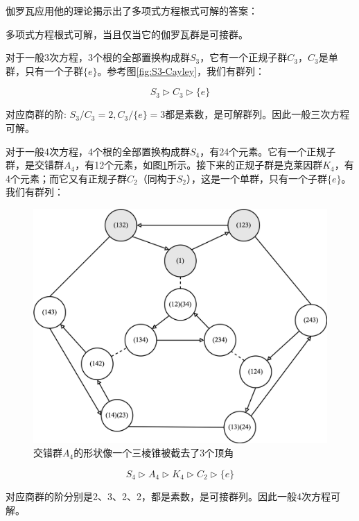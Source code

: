 \documentclass[b5paper]{ctexart}
\begin{document}
伽罗瓦应用他的理论揭示出了多项式方程根式可解的答案：

\begin{theorem}
多项式方程根式可解，当且仅当它的伽罗瓦群是可接群。
\end{theorem}

对于一般3次方程，3个根的全部置换构成群$S_3$，它有一个正规子群$C_3$，$C_3$是单群，只有一个子群$\{e\}$。参考图\ref{fig:S3-Cayley}，我们有群列：

\[
S_3 \rhd C_3 \rhd \{e\}
\]

对应商群的阶: $S_3/C_3 = 2, C_3/\{e\} = 3$都是素数，是可解群列。因此一般三次方程可解。

对于一般4次方程，4个根的全部置换构成群$S_4$，有24个元素。它有一个正规子群，是交错群$A_4$，有12个元素，如图\ref{fig:A4-Cayley}所示。接下来的正规子群是克莱因群$K_4$，有4个元素；而它又有正规子群$C_2$（同构于$S_2$），这是一个单群，只有一个子群$\{e\}$。我们有群列：

\begin{figure}[htbp]
 \centering
 \includegraphics[scale=0.4]{img/A4-Cayley}
 \caption{交错群$A_4$的形状像一个三棱锥被截去了3个顶角}
 \label{fig:A4-Cayley}
\end{figure}

\[
S_4 \rhd A_4 \rhd K_4 \rhd C_2 \rhd \{e\}
\]

对应商群的阶分别是2、3、2、2，都是素数，是可接群列。因此一般4次方程可解。
\end{document}
